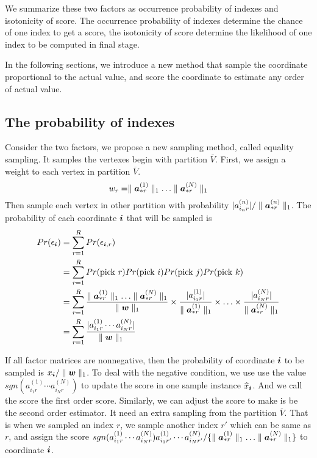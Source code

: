 \documentclass{article}
\newcommand{\Sca}[3]{{#1}^{(#2)}_{i_#2#3}}%
\newcommand{\V}[1]{{\bm{{\MakeLowercase{#1}}}}}%
\newcommand{\Vacol}[1]{\V{a}^{(#1)}_{*r}}
\newcommand{\norm}[2]{\parallel#1\parallel_{#2}}
\begin{document}
We summarize these two factors as occurrence probability of indexes and isotonicity of score. The occurrence probability of indexes determine the chance of one index to get a score, the isotonicity of score determine the likelihood of one index to be computed in final stage. 

In the following sections, we introduce a new method that sample the coordinate proportional to the actual value, and score the coordinate to estimate any order of actual value.

\subsection{The probability of indexes}

Consider the two factors, we propose a new sampling method, called equality sampling. It samples the vertexes begin with partition $\overline{V}$. First, we assign a weight to each vertex in partition $\overline{V}$.
\[
    w_r = \norm{\Vacol{1}}{1}\ldots\norm{\Vacol{N}}{1}
\]
Then sample each vertex in other partition with probability $|\Sca{a}{n}{r}|/\norm{\Vacol{n}}{1}$. The probability of each coordinate $\V{i}$ that will be sampled is
\begin{align*}
Pr(\epsilon_{\V{i}}) &= \sum_{r=1}^{R} Pr(\epsilon_{\V{i},r})\\
&= \sum_{r=1}^{R} Pr({\rm pick\ }r)Pr({\rm pick\ }i)Pr({\rm pick\ }j)Pr({\rm pick\ }k)\\
&= \sum_{r=1}^{R} \frac{\norm{\Vacol{1}}{1}\ldots\norm{\Vacol{N}}{1}}{\norm{\V{W}}{1}}\times \frac{|\Sca{a}{1}{r}|}{\norm{\Vacol{1}}{1}} \times\ldots\times \frac{|\Sca{a}{N}{r}|}{\norm{\Vacol{N}}{1}} \\
& = \sum_{r=1}^{R} \frac{|\Sca{a}{1}{r}\cdots\Sca{a}{N}{r}|}{\norm{\V{W}}{1}}
\end{align*}

If all factor matrices are nonnegative, then the probability of coordinate $\V{i}$ to be sampled is $x_{\V{i}}/\norm{\V{w}}{1}$. To deal with the negative condition, we use use the value $sgn(\Sca{a}{1}{r}\cdots\Sca{a}{N}{r})$ to update the score in one sample instance $\widehat{x}_{\V{i}}$. And we call the score the first order score. Similarly, we can adjust the score to make is be the second order estimator. It need an extra sampling from the partition $\overline{V}$. That is when we sampled an index $r$, we sample another index $r'$ which can be same as $r$, and assign the score $sgn(\Sca{a}{1}{r}\cdots\Sca{a}{N}{r})\Sca{a}{1}{r'}\cdots\Sca{a}{N}{r'}/\{ \norm{\Vacol{1}}{1}\ldots\norm{\Vacol{N}}{1}\}$ to coordinate $\V{i}$.
\end{document}
